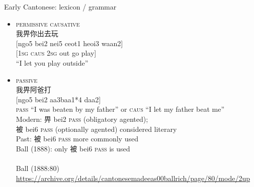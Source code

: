 \documentclass{beamer}
\begin{document}
\begin{frame}[fragile]{Early Cantonese: lexicon / grammar}

\begin{itemize}
    \item \textsc{permissive causative}\\
     {\footnotesize 我畀你出去玩\\
    {[ngo5 bei2 nei5 ceot1 heoi3 waan2]}\\
    {[\textsc{1sg} \textsc{caus} \textsc{2sg} out go play]}\\
    \enquote{I let you play outside}}\\
    \item \textsc{passive}\\
     {\footnotesize 我畀阿爸打\\
    {[ngo5 bei2 aa3baa1*4 daa2]}\\
    \textsc{pass} \enquote{I was beaten by my father} or \textsc{caus} \enquote{I let my father beat me}}\\
    \smallskip
    {\small Modern: 畀 bei2 \textsc{pass} (obligatory agented);\\ 被 bei6 \textsc{pass} (optionally agented) considered literary\\
    \smallskip
    Past: 被 bei6 \textsc{pass} more commonly used\\
    \quad Ball (1888): only 被 bei6 \textsc{pass} is used}\\
    \\
    {\tiny Ball (1888:80) \url{https://archive.org/details/cantonesemadeeas00ballrich/page/80/mode/2up}}\\
\end{itemize}

\end{frame}
\end{document}
